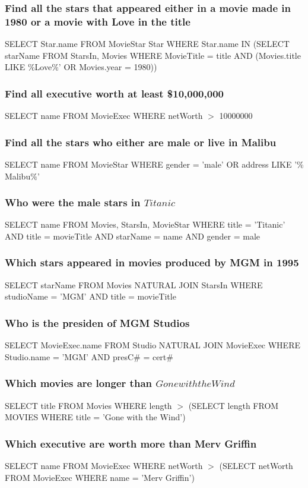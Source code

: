 \documentclass[12pt, a4paper]{article}
\begin{document}
			\subsubsection{Find all the stars that appeared either in a movie made in 1980 or a movie with Love in the title}
				SELECT Star.name FROM MovieStar Star WHERE Star.name IN (SELECT starName FROM StarsIn, Movies WHERE MovieTitle = title AND (Movies.title LIKE $\%$Love$\%$' OR Movies.year = 1980))
			\subsubsection{Find all executive worth at least \$10,000,000}
				SELECT name FROM MovieExec WHERE netWorth $>$ 10000000
			\subsubsection{Find all the stars who either are male or live in Malibu}
				SELECT name FROM MovieStar WHERE gender = 'male' OR address LIKE '$\%$Malibu$\%$'  
			\subsubsection{Who were the male stars in $Titanic$}
				SELECT name FROM Movies, StarsIn, MovieStar WHERE title = 'Titanic' AND title = movieTitle AND starName = name AND gender = male
			\subsubsection{Which stars appeared in movies produced by MGM in 1995}
				SELECT starName FROM Movies NATURAL JOIN StarsIn WHERE studioName = 'MGM' AND title = movieTitle
			\subsubsection{Who is the presiden of MGM Studios}
				SELECT MovieExec.name FROM Studio NATURAL JOIN MovieExec WHERE Studio.name = 'MGM' AND presC$\#$ = cert$\#$
			\subsubsection{Which movies are longer than $Gone with the Wind$}
				SELECT title FROM Movies WHERE length $>$ (SELECT length FROM MOVIES WHERE title = 'Gone with the Wind')
			\subsubsection{Which executive are worth more than Merv Griffin}
				SELECT name FROM MovieExec WHERE netWorth $>$ (SELECT netWorth FROM MovieExec WHERE name = 'Merv Griffin')
\end{document}
